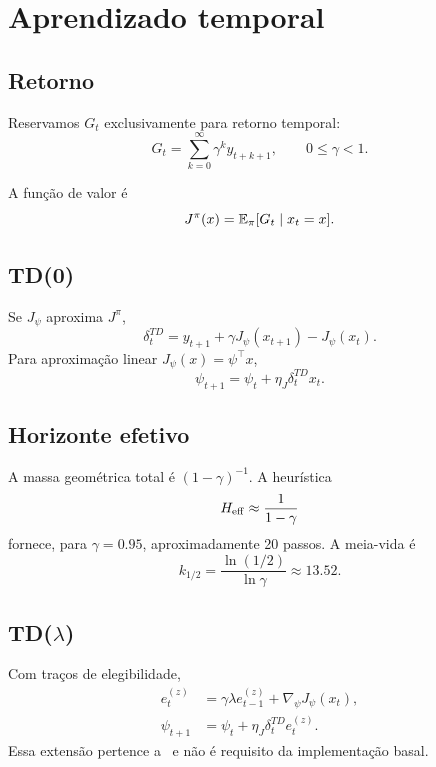 \section{Aprendizado temporal}

\subsection{Retorno}

Reservamos \(G_t\) exclusivamente para retorno temporal:
\begin{equation}
G_t=\sum_{k=0}^{\infty}\gamma^k y_{t+k+1},
\qquad0\le\gamma<1.
\label{eq:return}
\end{equation}

A função de valor é
\begin{equation}
J^\pi(x)=\operatorname{\mathbb{E}}_\pi[G_t\mid x_t=x].
\end{equation}

\subsection{TD(0)}

Se \(J_\psi\) aproxima \(J^\pi\),
\begin{equation}
\delta_t^{TD}=y_{t+1}+\gamma J_\psi(x_{t+1})-J_\psi(x_t).
\end{equation}
Para aproximação linear \(J_\psi(x)=\psi^\top x\),
\begin{equation}
\psi_{t+1}=\psi_t+\eta_J\delta_t^{TD}x_t.
\end{equation}

\subsection{Horizonte efetivo}

A massa geométrica total é \((1-\gamma)^{-1}\). A heurística
\begin{equation}
H_{\rm eff}\approx\frac1{1-\gamma}
\end{equation}
fornece, para \(\gamma=0.95\), aproximadamente 20 passos. A meia-vida é
\begin{equation}
k_{1/2}=\frac{\ln(1/2)}{\ln\gamma}\approx13.52.
\end{equation}

\subsection{TD(\texorpdfstring{$\lambda$}{lambda})}

Com traços de elegibilidade,
\begin{align}
e_t^{(z)}&=\gamma\lambda e_{t-1}^{(z)}+\nabla_\psi J_\psi(x_t),\\
\psi_{t+1}&=\psi_t+\eta_J\delta_t^{TD}e_t^{(z)}.
\end{align}
Essa extensão pertence a \EVPM\ e não é requisito da implementação basal.

